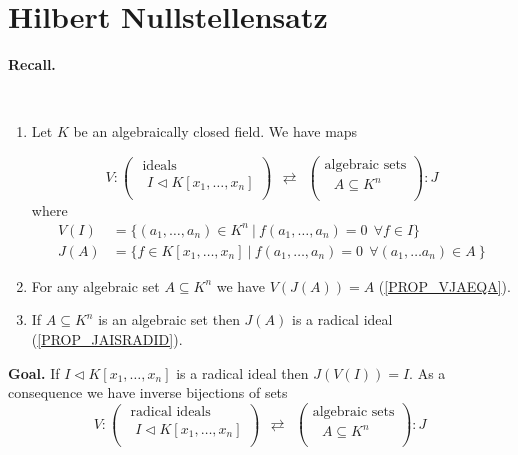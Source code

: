 \documentclass[12pt, letterpaper, oneside]{article}
\theoremstyle{plain}
\theoremstyle{definition}
\newcommand{\benu}{\begin{enumerate}}
\newcommand{\eenu}{\end{enumerate}}
\newcommand{\vs}{\vskip 5mm}
\newcommand{\isep}[1][0]{\setlength{\itemsep}{#1 mm}}
\begin{document}


\newpage
\section{Hilbert Nullstellensatz}
\label{SEC_NULLSTELLENSATZ}


\textbf{Recall.} 

\vskip -13mm

\ 
\benu
\isep[5]
\item Let $K$ be an algebraically closed field. We have maps

$$
V\colon
\begin{pmatrix}
\text{ ideals} \\[1mm]
\text{  $I\lhd  K[x_{1}, \dots, x_{n}]$} \\
\end{pmatrix}
\ \ \rightleftarrows \ \ 
\begin{pmatrix}
\text{algebraic sets} \\[1mm]
\text{ $A\subseteq K^{n}$} \\
\end{pmatrix} \colon J
$$
where 
\begin{align*}
V(I) & = \{(a_{1}, \dots, a_{n})\in K^{n} \ | \ f(a_{1}, \dots, a_{n}) = 0  \ \   \forall f\in I \} \\
J(A) &= \{ f\in K[x_{1}, \dots, x_{n}] \ | \ f(a_{1}, \dots, a_{n})=0 \ \ \forall (a_{1}, \dots a_{n})\in A \ \}
\end{align*}

\item For any algebraic set $A\subseteq K^{n}$ we have $V(J(A)) = A$ (\ref{PROP_VJAEQA}). 

\item If  $A\subseteq K^{n}$ is an algebraic set then $J(A)$ is a radical ideal (\ref{PROP_JAISRADID}).
\eenu

\vs\vs

\textbf{Goal.}  If $I\lhd K[x_{1}, \dots, x_{n}]$ is a radical ideal then $J(V(I)) =I$. As a consequence we 
have inverse bijections of sets 
$$
V\colon
\begin{pmatrix}
\text{ radical ideals} \\[1mm]
\text{  $I\lhd  K[x_{1}, \dots, x_{n}]$} \\
\end{pmatrix}
\ \ \rightleftarrows \ \ 
\begin{pmatrix}
\text{algebraic sets} \\[1mm]
\text{ $A\subseteq K^{n}$} \\
\end{pmatrix} \colon J
$$
\end{document}

